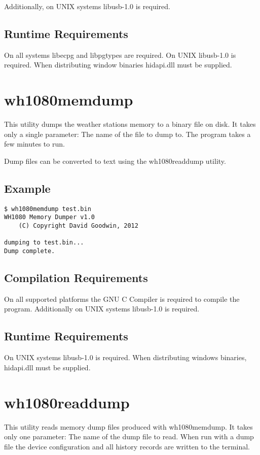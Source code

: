 \documentclass[a4paper,10pt,draft]{book}
\begin{document}
Additionally, on UNIX systems libusb-1.0 is required.

\section{Runtime Requirements}
On all systems libecpg and libpgtypes are required. On UNIX libusb-1.0 is required. When distributing window binaries hidapi.dll must be supplied.

\chapter{wh1080memdump}
This utility dumps the weather stations memory to a binary file on disk. It takes only a single parameter: The name of the file to dump to. The program takes a few minutes to run.

Dump files can be converted to text using the wh1080readdump utility.

\section{Example}
\begin{verbatim}
$ wh1080memdump test.bin
WH1080 Memory Dumper v1.0
	(C) Copyright David Goodwin, 2012

dumping to test.bin...
Dump complete.
\end{verbatim}


\section{Compilation Requirements}
On all supported platforms the GNU C Compiler is required to compile the program. Additionally on UNIX systems libusb-1.0 is required.

\section{Runtime Requirements}
On UNIX systems libusb-1.0 is required. When distributing windows binaries, hidapi.dll must be supplied.

\chapter{wh1080readdump}

This utility reads memory dump files produced with wh1080memdump. It takes only one parameter: The name of the dump file to read. When run with a dump file the device configuration and all history records are written to the terminal.
\end{document}
